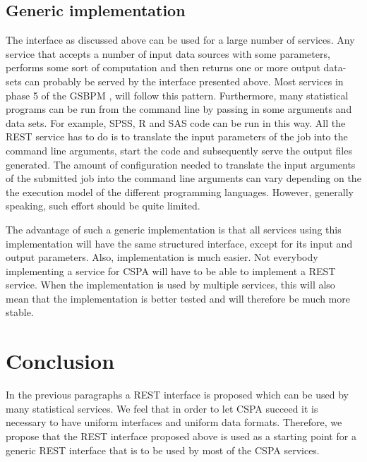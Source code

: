 \documentclass[a4paper]{article}
\begin{document}
\subsection{Generic implementation}
The interface as discussed above can be used for a large number of services. Any
service that accepts a number of input data sources with some parameters,
performs some sort of computation and then returns one or more output data-sets
can probably be served by the interface presented above. Most services in phase
5 of the GSBPM \citep{gsbpm2013}, will follow this pattern.  Furthermore, many
statistical programs can be run from the command line by passing in some
arguments and data sets. For example, SPSS, R and SAS code can be run in this
way. All the REST service has to do is to translate the input parameters of the
job into the command line arguments, start the code and subsequently serve the
output files generated.  The amount of configuration needed to translate the
input arguments of the submitted job into the command line arguments can vary
depending on the the execution model of the different programming languages.
However, generally speaking, such effort should be quite limited. 

The advantage of such a generic implementation is that all services using this
implementation will have the same structured interface, except for its input and
output parameters. Also, implementation is much easier. Not everybody
implementing a service for CSPA will have to be able to implement a REST
service. When the implementation is used by multiple services, this will also
mean that the implementation is better tested and will therefore be much more
stable. 




\section{Conclusion}

In the previous paragraphs a REST interface is proposed which can be used by
many statistical services. We feel that in order to let CSPA succeed it is
necessary to have uniform interfaces and uniform data formats. Therefore, we
propose that the REST interface proposed above is used as a starting point for a
generic REST interface that is to be used by most of the CSPA services. 



\end{document}
